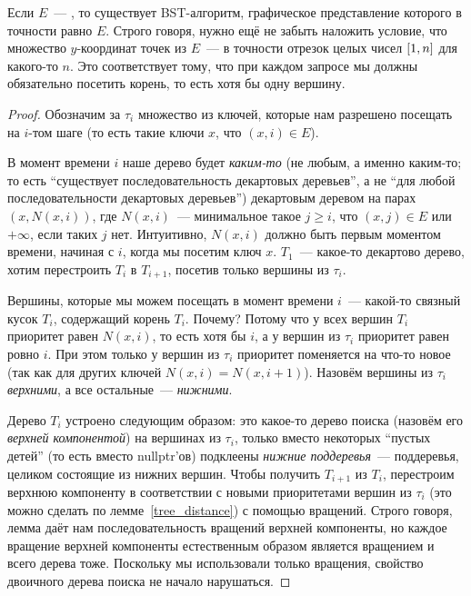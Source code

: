 \begin{theorem}\label{arbs_to_bst} Если $E$~--- \arbs, то существует BST-алгоритм, графическое представление
	которого в точности равно $E$. Строго говоря, нужно ещё не забыть наложить
	условие, что множество $y$-координат точек из $E$~--- в точности отрезок целых чисел $[1, n]$ для какого-то $n$. Это соответствует тому, что при каждом запросе мы должны обязательно посетить корень, то есть хотя бы одну вершину.
\end{theorem}
\begin{proof} Обозначим за $\tau_i$ множество из ключей, которые нам разрешено посещать на $i$-том шаге (то есть такие ключи $x$, что $(x, i) \in E$).

	В момент времени $i$ наше дерево будет \emph{каким-то} (не любым, а именно каким-то; то есть ``существует последовательность декартовых деревьев'', а не ``для любой последовательности декартовых деревьев'') декартовым деревом на парах $(x, N(x, i))$, где $N(x, i)$~--- минимальное такое $j \geqslant i$, что $(x, j) \in E$ или $+\infty$, если таких $j$ нет. Интуитивно, $N(x, i)$ должно быть первым моментом времени, начиная с $i$, когда мы посетим ключ $x$. $T_1$~--- какое-то декартово дерево, хотим перестроить $T_i$ в $T_{i+1}$, посетив только вершины из $\tau_i$.

	Вершины, которые мы можем посещать в момент времени $i$~--- какой-то связный кусок $T_i$, содержащий корень $T_i$. Почему? Потому что у всех вершин $T_i$ приоритет равен $N(x, i)$, то есть хотя бы $i$, а у вершин из $\tau_i$ приоритет равен ровно $i$. При этом только
	у вершин из $\tau_i$ приоритет поменяется на что-то новое (так как для других ключей $N(x, i) = N(x, i + 1)$).  Назовём вершины из $\tau_i$ \emph{верхними}, а все остальные~--- \emph{нижними}.

	Дерево $T_i$ устроено следующим образом: это какое-то дерево поиска (назовём его \emph{верхней компонентой}) на вершинах из $\tau_i$, только вместо некоторых ``пустых детей'' (то есть вместо \textrm{nullptr}'ов) подклеены \emph{нижние поддеревья}~--- поддеревья, целиком состоящие из нижних вершин. Чтобы получить $T_{i+1}$ из $T_i$, перестроим верхнюю компоненту в соответствии с новыми приоритетами вершин из $\tau_i$ (это можно сделать по лемме~\ref{tree_distance}) с помощью вращений. Строго говоря, лемма даёт нам последовательность вращений верхней компоненты, но каждое вращение верхней компоненты естественным образом является вращением и всего дерева тоже. Поскольку мы использовали только вращения, свойство двоичного дерева поиска не начало нарушаться.


\end{proof}

